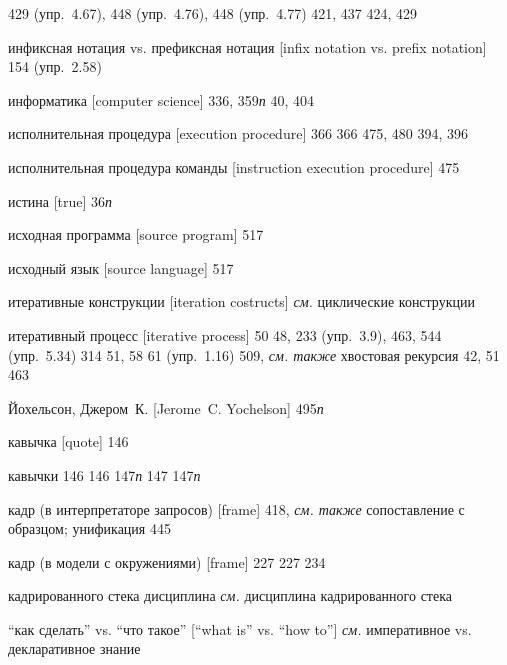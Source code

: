 \begin{theindex}
   429 (упр.~4.67), 448 (упр.~4.76), 448 (упр.~4.77)
   421, 437
   424, 429
\item {инфиксная нотация vs. префиксная нотация [infix notation vs. prefix notation]} 154 (упр.~2.58)
\item {информатика [computer science]} 336, 359{\it п}
   40, 404
\item {исполнительная процедура [execution procedure]} 366
   366
   475, 480
   394, 396
\item {исполнительная процедура команды [instruction execution procedure]} 475
\item {истина [true]} 36{\it п}
\item {исходная программа [source program]} 517
\item {исходный язык [source language]} 517
\item {итеративные конструкции [iteration costructs]} {\it см.} циклические конструкции
\item {итеративный процесс [iterative process]} 50
   48, 233 (упр.~3.9), 463, 544 (упр.~5.34)
   314
   51, 58
   61 (упр.~1.16)
   509, {\it см. также} хвостовая рекурсия
   42, 51
   463
\bigskip
\item {Йохельсон, Джером~К. [Jerome~C. Yochelson]} 495{\it п}
\bigskip
\item {кавычка [quote]} 146
\item {кавычки} 146
   146
   147{\it п}
   147
   147{\it п}
\item {кадр (в интерпретаторе запросов) [frame]} 418, {\it см. также} сопоставление с образцом; унификация
   445
\item {кадр (в модели с окружениями) [frame]} 227
   227
   234
\item {кадрированного стека дисциплина} {\it см.} дисциплина кадрированного стека
\item {``как сделать'' vs. ``что такое'' [``what is'' vs. ``how to'']} {\it см.} императивное vs. декларативное знание

\end{theindex}
